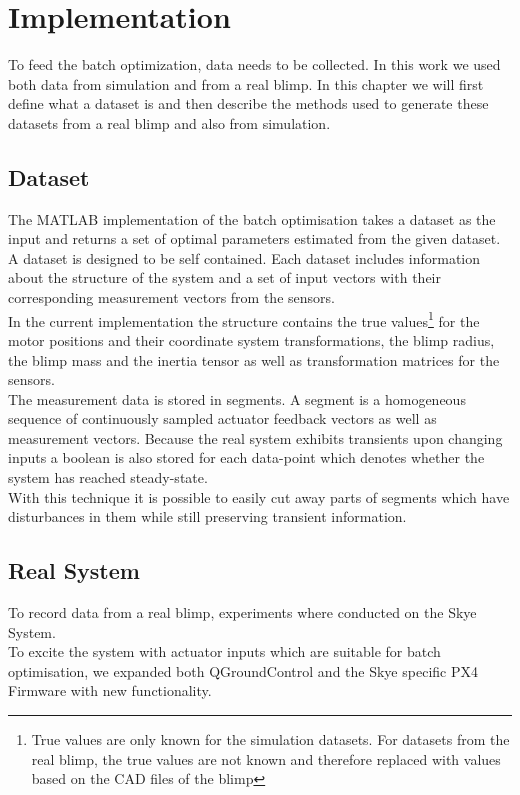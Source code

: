 \chapter{Implementation}
\label{chap:implementation}

To feed the batch optimization, data needs to be collected.
In this work we used both data from simulation and from a real blimp.
In this chapter we will first define what a dataset is and then 
describe the methods used to generate these datasets from a real blimp and also from simulation.

\section{Dataset}
\label{sec:dataset}
The \textsc{MATLAB} implementation of the batch optimisation takes a dataset as the input and returns a set of optimal parameters estimated from the given dataset. \\
A dataset is designed to be self contained. 
Each dataset includes information about the structure of the system and a set of input vectors with their corresponding measurement vectors from the sensors. \\
In the current implementation the structure contains the true values\footnote{True values are only known for the simulation datasets. 
For datasets from the real blimp, the true values are not known and therefore replaced with values based on the CAD files of the blimp}
for the motor positions and their coordinate system transformations, the blimp radius, the blimp mass and the inertia tensor as well as transformation matrices for the sensors. \\
The measurement data is stored in segments.
A segment is a homogeneous sequence of continuously sampled actuator feedback vectors as well as measurement vectors.
Because the real system exhibits transients upon changing inputs a boolean is also stored for each data-point which denotes whether the system has reached steady-state. \\
With this technique it is possible to easily cut away parts of segments which have disturbances in them while still preserving transient information.

\section{Real System}
\label{sec:real_system}
To record data from a real blimp, experiments where conducted on the Skye System. \\
To excite the system with actuator inputs which are suitable for batch optimisation, we expanded both QGroundControl and the Skye specific PX4 Firmware with new functionality.

